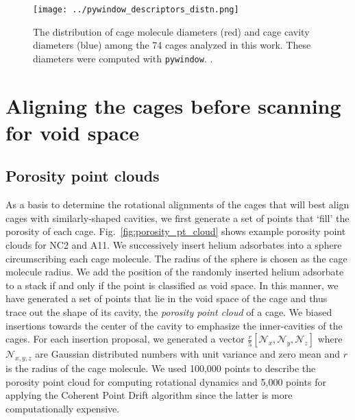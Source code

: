 \documentclass[journal=jacsat,manuscript=article]{achemso}
\begin{document}
\begin{figure}
\centering
	\texttt{[image: ../pywindow\_descriptors\_distn.png]}
	\caption{The distribution of cage molecule diameters (red) and cage cavity diameters (blue) among the 74 cages analyzed in this work. These diameters were computed with \texttt{pywindow}. \cite{miklitz2018pywindow}.
	} \label{fig:pywindow_descriptors_distn}
\end{figure}

\newpage
\clearpage

\section{Aligning the cages before scanning for void space} 

{\color{red}
\subsection{Porosity point clouds}
\label{sec:porosity_pt_cld}
As a basis to determine the rotational alignments of the cages that will best align cages with similarly-shaped cavities, we first generate a set of points that `fill' the porosity of each cage. Fig.~\ref{fig:porosity_pt_cloud} shows example porosity point clouds for NC2 and A11. We successively insert helium adsorbates into a sphere circumscribing each cage molecule. The radius of the sphere is chosen as the cage molecule radius. We add the position of the randomly inserted helium adsorbate to a stack if and only if the point is classified as void space. In this manner, we have generated a set of points that lie in the void space of the cage and thus trace out the shape of its cavity, the \emph{porosity point cloud} of a cage. We biased insertions towards the center of the cavity to emphasize the inner-cavities of the cages. For each insertion proposal, we generated a vector $\frac{r}{5}[\mathcal{N}_x,\mathcal{N}_y,\mathcal{N}_z]$ where $\mathcal{N}_{x,y,z}$ are Gaussian distributed numbers with unit variance and zero mean and $r$ is the radius of the cage molecule. We used 100,000 points to describe the porosity point cloud for computing rotational dynamics and 5,000 points for applying the Coherent Point Drift algorithm since the latter is more computationally expensive.

}
\end{document}
